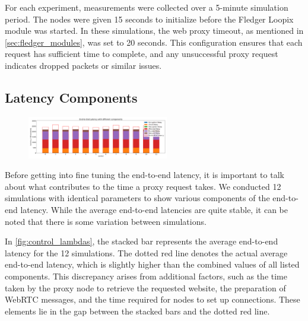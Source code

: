 \documentclass[a4paper,11pt,oneside]{report}
\begin{document}
For each experiment, measurements were collected over a 5-minute simulation period. The nodes were given 15 seconds to initialize before the Fledger Loopix module was started. In these simulations, the web proxy timeout, as mentioned in \autoref{sec:fledger_modules}, was set to 20 seconds. This configuration ensures that each request has sufficient time to complete, and any unsuccessful proxy request indicates dropped packets or similar issues.

\subsection{Latency Components}

\begin{figure}
\vspace{-10pt}
    \centering
    \includegraphics[width=0.55\textwidth]{plots/control_latency_components.png}
    \caption{}
    \label{fig:control_lambdas}
\end{figure}

Before getting into fine tuning the end-to-end latency, it is important to talk about what contributes to the time a proxy request takes. We conducted 12 simulations with identical parameters to show various components of the end-to-end latency. While the average end-to-end latencies are quite stable, it can be noted that there is some variation between simulations.

In \autoref{fig:control_lambdas}, the stacked bar represents the average end-to-end latency for the 12 simulations. The dotted red line denotes the actual average end-to-end latency, which is slightly higher than the combined values of all listed components. This discrepancy arises from additional factors, such as the time taken by the proxy node to retrieve the requested website, the preparation of WebRTC messages, and the time required for nodes to set up connections. These elements lie in the gap between the stacked bars and the dotted red line.
\end{document}
